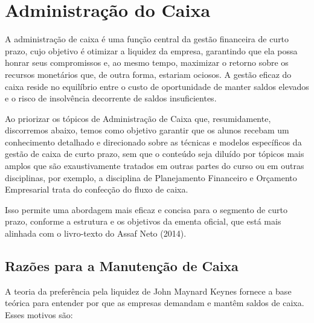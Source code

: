 \documentclass[
  a4paper,
]{book}
\begin{document}

\chapter{Administração do Caixa}\label{sec-caixa}

A administração de caixa é uma função central da gestão financeira de
curto prazo, cujo objetivo é otimizar a liquidez da empresa, garantindo
que ela possa honrar seus compromissos e, ao mesmo tempo, maximizar o
retorno sobre os recursos monetários que, de outra forma, estariam
ociosos. A gestão eficaz do caixa reside no equilíbrio entre o custo de
oportunidade de manter saldos elevados e o risco de insolvência
decorrente de saldos insuficientes.

Ao priorizar os tópicos de Administração de Caixa que, resumidamente,
discorremos abaixo, temos como objetivo garantir que os alunos recebam
um conhecimento detalhado e direcionado sobre as técnicas e modelos
específicos da gestão de caixa de curto prazo, sem que o conteúdo seja
diluído por tópicos mais amplos que são exaustivamente tratados em
outras partes do curso ou em outras disciplinas, por exemplo, a
disciplina de Planejamento Financeiro e Orçamento Empresarial trata do
confecção do fluxo de caixa.

Isso permite uma abordagem mais eficaz e concisa para o segmento de
curto prazo, conforme a estrutura e os objetivos da ementa oficial, que
está mais alinhada com o livro-texto do Assaf Neto (2014).

\section{Razões para a Manutenção de
Caixa}\label{razuxf5es-para-a-manutenuxe7uxe3o-de-caixa}

A teoria da preferência pela liquidez de John Maynard Keynes fornece a
base teórica para entender por que as empresas demandam e mantêm saldos
de caixa. Esses motivos são:
\end{document}
